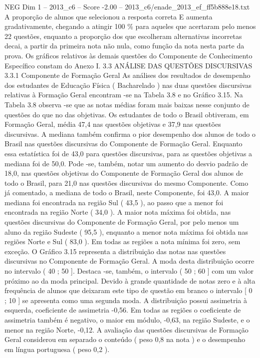 \begin{textsample}{NEG Dim 1 – 2013\_c6 – Score -2.00 – 2013\_c6/enade\_2013\_ef\_ff5b888e18.txt}
A proporção de alunos que selecionou a resposta correta E aumenta gradativamente, chegando a atingir 100 \% para aqueles que acertaram pelo menos 22 questões, enquanto a proporção dos que escolheram alternativas incorretas decai, a partir da primeira nota não nula, como função da nota nesta parte da prova.
Os gráficos relativos às demais questões do Componente de Conhecimento Específico constam do Anexo I. 3.3 ANÁLISE DAS QUESTÕES DISCURSIVAS 3.3.1 Componente de Formação Geral As análises dos resultados de desempenho dos estudantes de Educação Física ( Bacharelado ) nas duas questões discursivas relativas à Formação Geral encontram -se na Tabela 3.8 e no Gráfico 3.15.
Na Tabela 3.8 observa -se que as notas médias foram mais baixas nesse conjunto de questões do que no das objetivas.
Os estudantes de todo o Brasil obtiveram, em Formação Geral, média 47,4 nas questões objetivas e 37,9 nas questões discursivas.
A mediana também confirma o pior desempenho dos alunos de todo o Brasil nas questões discursivas do Componente de Formação Geral.
Enquanto essa estatística foi de 43,0 para questões discursivas, para as questões objetivas a mediana foi de 50,0.
Pode -se, também, notar um aumento do desvio padrão de 18,0, nas questões objetivas do Componente de Formação Geral dos alunos de todo o Brasil, para 21,0 nas questões discursivas do mesmo Componente.
Como já comentado, a mediana de todo o Brasil, neste Componente, foi 43,0.
A maior mediana foi encontrada na região Sul ( 43,5 ), ao passo que a menor foi encontrada na região Norte ( 34,0 ).
A maior nota máxima foi obtida, nas questões discursivas do Componente de Formação Geral, por pelo menos um aluno da região Sudeste ( 95,5 ), enquanto a menor nota máxima foi obtida nas regiões Norte e Sul ( 83,0 ).
Em todas as regiões a nota mínima foi zero, sem exceção.
O Gráfico 3.15 representa a distribuição das notas nas questões discursivas no Componente de Formação Geral.
A moda desta distribuição ocorre no intervalo ( 40 ; 50 ].
Destaca -se, também, o intervalo ( 50 ; 60 ] com um valor próximo ao da moda principal.
Devido à grande quantidade de notas zero e à alta frequência de alunos que deixaram este tipo de questão em branco o intervalo [ 0 ; 10 ] se apresenta como uma segunda moda.
A distribuição possui assimetria à esquerda, coeficiente de assimetria -0,56.
Em todas as regiões o coeficiente de assimetria também é negativo, o maior em módulo, -0,63, na região Sudeste, e o menor na região Norte, -0,12.
A avaliação das questões discursivas de Formação Geral considerou em separado o conteúdo ( peso 0,8 na nota ) e o desempenho em língua portuguesa ( peso 0,2 ).

\end{textsample}

